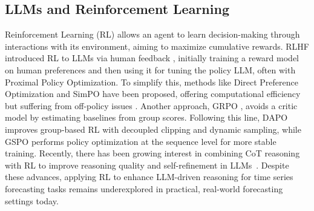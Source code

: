 \subsection{LLMs and Reinforcement Learning}
Reinforcement Learning (RL) \citep{kaelbling1996reinforcement} allows an agent to learn decision-making through interactions with its environment, aiming to maximize cumulative rewards. RLHF introduced RL to LLMs via human feedback \citep{ouyang2022training, kaufmann2023survey}, initially training a reward model on human preferences and then using it for tuning the policy LLM, often with Proximal Policy Optimization.
To simplify this, methods like Direct Preference Optimization \citep{rafailov2023direct} and SimPO \citep{meng2024simpo} have been proposed, offering computational efficiency but suffering from off-policy issues \citep{pang2024iterative}. 
Another approach, GRPO \citep{shao2024deepseekmath}, avoids a critic model by estimating baselines from group scores. Following this line, DAPO \citep{yu2026dapo} improves group-based RL with decoupled clipping and dynamic sampling, while GSPO \citep{zheng2025group} performs policy optimization at the sequence level for more stable training. 
Recently, there has been growing interest in combining CoT reasoning with RL to improve reasoning quality and self-refinement in LLMs~\citep{chu2025sft, chen2025sft, song2025r1, li2024getting}. Despite these advances, applying RL to enhance LLM-driven reasoning for time series forecasting tasks remains underexplored in practical, real-world forecasting settings today.


